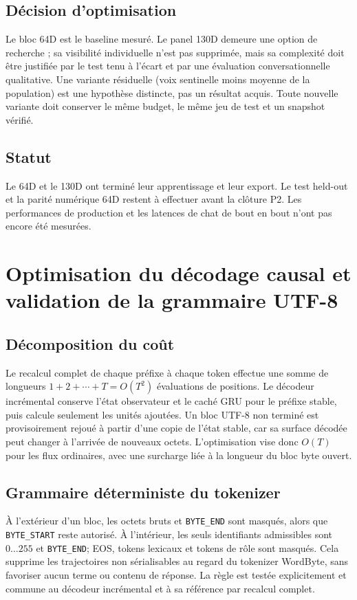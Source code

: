\documentclass[11pt,a4paper]{report}
\begin{document}
\section{Décision d'optimisation}
Le bloc 64D est le baseline mesuré. Le panel 130D demeure une option de recherche ; sa visibilité individuelle n'est pas supprimée, mais sa complexité doit être justifiée par le test tenu à l'écart et par une évaluation conversationnelle qualitative. Une variante résiduelle (voix sentinelle moins moyenne de la population) est une hypothèse distincte, pas un résultat acquis. Toute nouvelle variante doit conserver le même budget, le même jeu de test et un snapshot vérifié.
\section{Statut}
Le 64D et le 130D ont terminé leur apprentissage et leur export. Le test held-out et la parité numérique 64D restent à effectuer avant la clôture P2. Les performances de production et les latences de chat de bout en bout n'ont pas encore été mesurées.

\chapter{Optimisation du décodage causal et validation de la grammaire UTF-8}
\section{Décomposition du coût}
Le recalcul complet de chaque préfixe à chaque token effectue une somme de longueurs $1+2+\cdots+T=O(T^2)$ évaluations de positions. Le décodeur incrémental conserve l'état observateur et le caché GRU pour le préfixe stable, puis calcule seulement les unités ajoutées. Un bloc UTF-8 non terminé est provisoirement rejoué à partir d'une copie de l'état stable, car sa surface décodée peut changer à l'arrivée de nouveaux octets. L'optimisation vise donc $O(T)$ pour les flux ordinaires, avec une surcharge liée à la longueur du bloc byte ouvert.
\section{Grammaire déterministe du tokenizer}
À l'extérieur d'un bloc, les octets bruts et \texttt{BYTE\_END} sont masqués, alors que \texttt{BYTE\_START} reste autorisé. À l'intérieur, les seuls identifiants admissibles sont $0\ldots255$ et \texttt{BYTE\_END}; EOS, tokens lexicaux et tokens de rôle sont masqués. Cela supprime les trajectoires non sérialisables au regard du tokenizer WordByte, sans favoriser aucun terme ou contenu de réponse. La règle est testée explicitement et commune au décodeur incrémental et à sa référence par recalcul complet.
\end{document}
